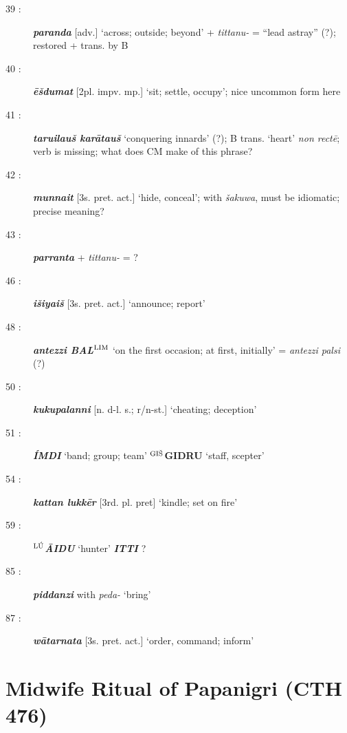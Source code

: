 \documentclass[10pt]{article}
\newcommand{\supersc}[1]{$^{\textrm{\scriptsize{#1}}}$}  	%
\newcommand{\bit}[1]{\textbf{\textit{#1}}}				%
\newcommand{\p}[1]{{\tiny[{#1}]}}					%
\newcommand{\hith}{\textsubwedge{h}}
\newcommand{\man}{\supersc{L\'U}}
\newcommand{\wood}{\supersc{GI\v{S}}}
\renewcommand{\.}[1]{\textsubdot{#1}}
\begin{document}
\begin{description}
\item[39 :] \bit{paranda} \p{adv.} `across; outside; beyond' + \textit{tittanu-} = ``lead astray'' (?); restored + trans. by B

\item[40 :] \bit{\=e\v{s}dumat} \p{2pl. impv. mp.} `sit; settle, occupy'; nice uncommon form here

\item[41 :] \bit{tar{\hith}uilau\v{s} kar\=atau\v{s}} `conquering innards' (?); B trans. `heart' \textit{non rect\=e}; verb is missing; what does CM make of this phrase?

\item[42 :] \bit{munnait} \p{3s. pret. act.} `hide, conceal'; with \textit{\v{s}akuwa}, must be idiomatic; precise meaning?
 
\item[43 :] \bit{parranta} + \textit{tittanu-} = ?

\item[46 :] \bit{i\v{s}iya{\hith\hith}i\v{s}} \p{3s. pret. act.} `announce; report'

\item[48 :] \bit{{\hith}antezzi \textbf{BAL}\bit{\supersc{LIM}}} `on the first occasion; at first, initially' = \textit{{\hith}antezzi palsi} (?)

\item[50 :] \bit{kukupalanni} \p{n. d-l. s.; r/n-st.} `cheating; deception'

\item[51 :] \bit{\'IMDI} `band; group; team' \textbf{{\wood}GIDRU} `staff, scepter'

\item[54 :] \bit{kattan lukk\=er} \p{3rd. pl. pret} `kindle; set on fire'

\item[59 :] \textbf{\man}\bit{\=AIDU} `hunter' \bit{ITTI} ?

\item[85 :] \bit{piddanzi} with \textit{peda-} `bring'

\item[87 :] \bit{w\=atarna{\hith}ta} \p{3s. pret. act.} `order, command; inform'


\end{description}

\section{Midwife Ritual of Papanigri (CTH 476)}
\end{document}
